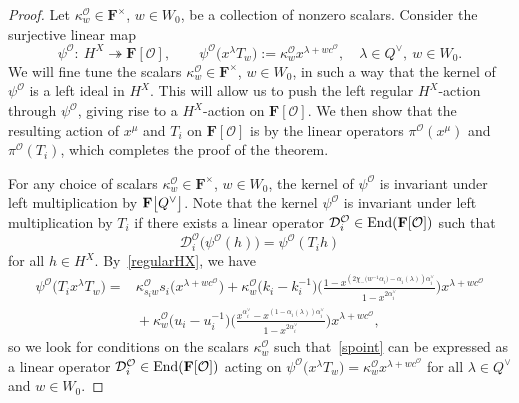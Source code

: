 \documentclass[pdftex]{sigma}
\numberwithin{equation}{section}
\begin{document}
\begin{proof}
Let $\kappa_w^\mathcal{O}\in\mathbf{F}^\times$, $w\in W_0$, be a collection of nonzero scalars.
Consider the surjective linear map
\begin{equation}\label{psicmap}
\psi^\mathcal{O}\colon\ H^X\twoheadrightarrow \mathbf{F}[\mathcal{O}],\qquad \psi^\mathcal{O}\bigl(x^\lambda T_w\bigr):=\kappa_w^\mathcal{O}x^{\lambda+wc^{\mathcal{O}}},\quad \lambda\in Q^\vee,\ w\in W_0.
\end{equation}
We will fine tune the scalars $\kappa_w^\mathcal{O}\in\mathbf{F}^\times$, $w\in W_0$, in such a way that the kernel of $\psi^\mathcal{O}$
is a left ideal in $H^X$. This will allow us to push the left regular $H^X$-action through $\psi^\mathcal{O}$, giving rise to a
$H^X$-action on $\mathbf{F}[\mathcal{O}]$. We then show that the resulting action of $x^\mu$ and $T_i$ on $\mathbf{F}[\mathcal{O}]$ is by the linear operators $\pi^\mathcal{O}(x^\mu)$ and $\pi^\mathcal{O}(T_i)$, which completes the proof of the theorem.

For any choice of scalars $\kappa_w^\mathcal{O}\in\mathbf{F}^\times$, $w\in W_0$, the kernel of $\psi^\mathcal{O}$ is invariant under left multiplication by $\mathbf{F}\smash{\bigl[Q^\vee\bigr]}$.
Note that the kernel $\psi^\mathcal{O}$ is invariant under left multiplication by $T_i$ if there exists a linear operator $\mathcal{D}_i^\mathcal{O}\in\textup{End}(\mathbf{F}[\mathcal{O}])$ such that
\begin{equation*}%
\mathcal{D}_i^\mathcal{O}\bigl(\psi^\mathcal{O}(h)\bigr)=\psi^\mathcal{O}(T_ih)
\end{equation*}
for all $h\in H^X$.
By~\eqref{regularHX}, we have
\begin{align}
\psi^\mathcal{O}\bigl(T_ix^\lambda T_w\bigr)={}&\kappa_{s_iw}^\mathcal{O}s_i\bigl(x^{\lambda+wc^{\mathcal{O}}}\bigr)
+ \kappa_w^\mathcal{O}\bigl(k_i-k_i^{-1}\bigr)\Biggl(\frac{1-x^{(2\chi_-\bigl(w^{-1}\alpha_i\bigr)-\alpha_i(\lambda))\alpha_i^\vee}}{1-x^{2\alpha_i^\vee}}\Biggr)x^{\lambda+wc^{\mathcal{O}}}\nonumber\\
&{}+
\kappa_w^\mathcal{O}\bigl(u_i-u_i^{-1}\bigr)\Biggl(\frac{x^{\alpha_i^\vee}-x^{(1-\alpha_i(\lambda))\alpha_i^\vee}}{1-x^{2\alpha_i^\vee}}\Biggr)x^{\lambda+wc^{\mathcal{O}}},
\label{spoint}
\end{align}
so we look for conditions on the scalars $\kappa_w^\mathcal{O}$ such that~\eqref{spoint} can be expressed as
a linear operator $\mathcal{D}_i^\mathcal{O}\in\textup{End}(\mathbf{F}[\mathcal{O}])$ acting on $\psi^\mathcal{O}\bigl(x^\lambda T_w\bigr)=\kappa_w^\mathcal{O}x^{\lambda+wc^\mathcal{O}}$ for all $\lambda\in Q^\vee$ and $w\in W_0$.


\end{proof}
\end{document}
